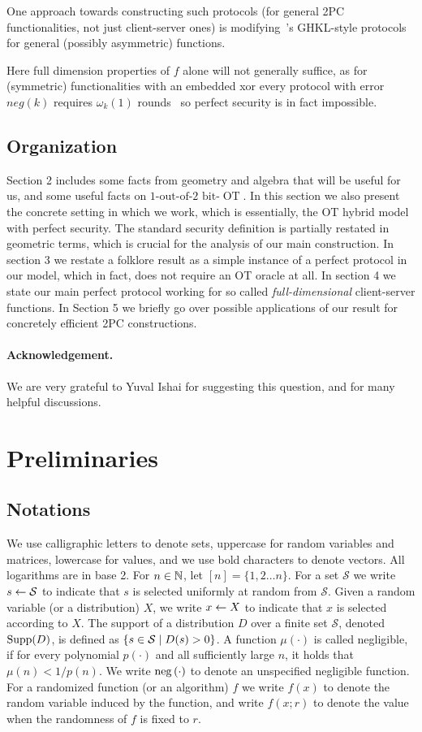 \documentclass{llncs}
\newcommand{\OT}{\operatorname{OT}}
\newcommand{\bOT}[2]{#1\text{-out-of-}#2\text{ bit-}\OT}
\renewcommand{\S}{\mathcal{S}}
\begin{document}
One approach towards constructing such protocols (for general 2PC functionalities, not just client-server ones) is modifying~\cite{Ash14}'s GHKL-style protocols for general (possibly asymmetric) functions. 

Here full dimension properties of $f$ alone will not generally suffice, as for (symmetric) functionalities with an embedded xor every protocol with error $neg(k)$ requires $\omega_k(1)$ rounds~\cite{GHKL08} so perfect security is in fact impossible.

\subsection{Organization} Section 2 includes some facts from geometry
and algebra that will be useful for us, and some useful facts on $\bOT{1}{2}$. In this section we also present the concrete setting in which we work, which is essentially, the OT hybrid model with perfect security. The standard security definition is partially restated in geometric terms, which is crucial for the analysis of our main construction.
In section 3 we restate a folklore result as a simple instance of a perfect protocol in our model, which in fact, does not require an OT oracle at all. In section 4 we state our main perfect protocol working for so called \emph{full-dimensional} client-server functions.
In Section 5 we briefly go over possible applications of our result for concretely efficient 2PC constructions.

\paragraph{Acknowledgement.}

We are very grateful to Yuval Ishai for suggesting this question, and for many helpful discussions. 

\section{Preliminaries}
\subsection{Notations}
We use calligraphic letters to denote sets, uppercase for random variables and matrices, lowercase for values, and we use bold characters to denote vectors. All logarithms are in base 2. For $n\in{\mathbb{N}}$, let $[n]=\{1,2\ldots n\}$. For a set $\S$ we write $s\from\S$ to indicate that $s$ is selected uniformly at random from $\S$. Given a random variable (or a distribution) $X$, we write $x\leftarrow X$ to indicate that $x$ is selected according to $X$. %
The support of a distribution $D$ over a finite set $\S$, denoted $\operatorname{Supp}(D)$, is defined as $\left\{s\in\S\cond D(s)>0\right\}$. A function $\mu(\cdot)$ is called negligible, if for every polynomial $p(\cdot)$ and all sufficiently large $n$, it holds that $\mu(n)<1/p(n)$. We write $\operatorname{neg}\left ( \cdot \right )$ to denote an unspecified negligible function. For a randomized function (or an algorithm) $f$ we write $f(x)$ to denote the random variable induced by the function, and write $f(x;r)$ to denote the value when the randomness of $f$ is fixed to $r$.
\end{document}
